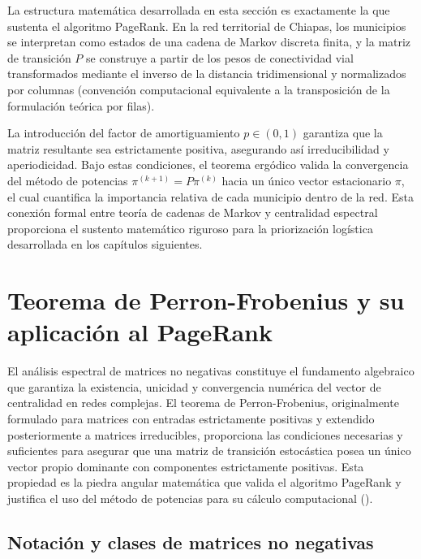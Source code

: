 \documentclass[
  spanish,
  us-letterpaper,
]{scrreprt}
\numberwithin{equation}{section}
\begin{document}
La estructura matemática desarrollada en esta sección es exactamente la
que sustenta el algoritmo PageRank. En la red territorial de Chiapas,
los municipios se interpretan como estados de una cadena de Markov
discreta finita, y la matriz de transición \(P\) se construye a partir
de los pesos de conectividad vial transformados mediante el inverso de
la distancia tridimensional y normalizados por columnas (convención
computacional equivalente a la transposición de la formulación teórica
por filas).

La introducción del factor de amortiguamiento \(p \in (0,1)\) garantiza
que la matriz resultante sea estrictamente positiva, asegurando así
irreducibilidad y aperiodicidad. Bajo estas condiciones, el teorema
ergódico valida la convergencia del método de potencias
\(\pi^{(k+1)} = P \pi^{(k)}\) hacia un único vector estacionario
\(\pi\), el cual cuantifica la importancia relativa de cada municipio
dentro de la red. Esta conexión formal entre teoría de cadenas de Markov
y centralidad espectral proporciona el sustento matemático riguroso para
la priorización logística desarrollada en los capítulos siguientes.

\section{Teorema de Perron-Frobenius y su aplicación al
PageRank}\label{teorema-de-perron-frobenius-y-su-aplicaciuxf3n-al-pagerank}

El análisis espectral de matrices no negativas constituye el fundamento
algebraico que garantiza la existencia, unicidad y convergencia numérica
del vector de centralidad en redes complejas. El teorema de
Perron-Frobenius, originalmente formulado para matrices con entradas
estrictamente positivas y extendido posteriormente a matrices
irreducibles, proporciona las condiciones necesarias y suficientes para
asegurar que una matriz de transición estocástica posea un único vector
propio dominante con componentes estrictamente positivas. Esta propiedad
es la piedra angular matemática que valida el algoritmo PageRank y
justifica el uso del método de potencias para su cálculo computacional
().

\subsection{Notación y clases de matrices no
negativas}\label{notaciuxf3n-y-clases-de-matrices-no-negativas}
\end{document}
